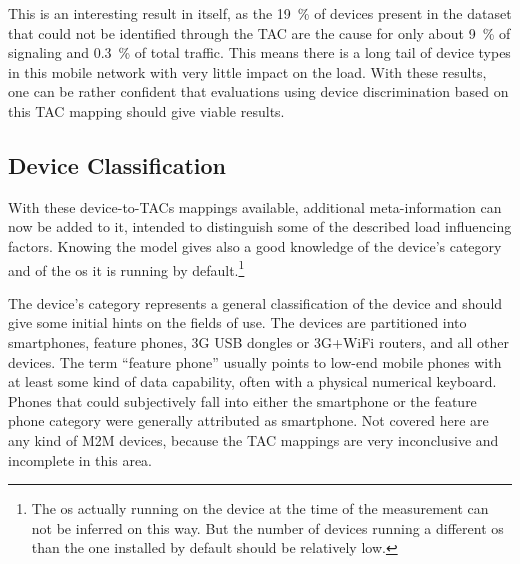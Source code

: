 This is an interesting result in itself, as the \SI{19}{\percent} of devices present in the dataset that could not be identified through the \gls{TAC} are the cause for only about \SI{9}{\percent} of signaling and \SI{0.3}{\percent} of total traffic. This means there is a long tail of device types in this mobile network with very little impact on the load. 
With these results, one can be rather confident that evaluations using device discrimination based on this \gls{TAC} mapping should give viable results.


\subsection{Device Classification}

With these device-to-\glspl{TAC} mappings available, additional meta-information can now be added to it, intended to distinguish some of the described load influencing factors. Knowing the model gives also a good knowledge of the device's category and of the \gls{os} it is running by default.\footnote{The \gls{os} actually running on the device at the time of the measurement can not be inferred on this way. But the number of devices running a different \gls{os} than the one installed by default should be relatively low.
}

The device's category represents a general classification of the device and should give some initial hints on the fields of use. The devices are partitioned into smartphones, feature phones, \gls{3G} USB dongles or \gls{3G}+WiFi routers, and all other devices. The term ``feature phone'' usually points to low-end mobile phones with at least some kind of data capability, often with a physical numerical keyboard. Phones that could subjectively fall into either the smartphone or the feature phone category were generally attributed as smartphone. Not covered here are any kind of \gls{M2M} devices, because the \gls{TAC} mappings are very inconclusive and incomplete in this area.

